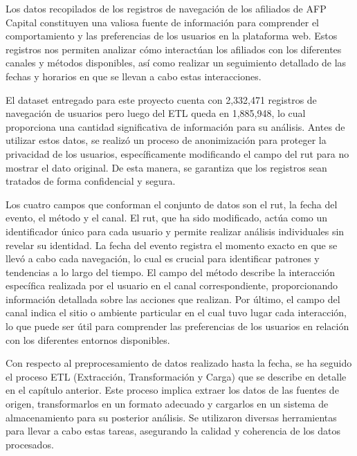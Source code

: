 Los datos recopilados de los registros de navegación de los afiliados de AFP Capital constituyen una valiosa fuente de información para comprender el comportamiento y las preferencias de los usuarios en la plataforma web. Estos registros nos permiten analizar cómo interactúan los afiliados con los diferentes canales y métodos disponibles, así como realizar un seguimiento detallado de las fechas y horarios en que se llevan a cabo estas interacciones.

El dataset entregado para este proyecto cuenta con 2,332,471 registros de navegación de usuarios pero luego del ETL queda en 1,885,948, lo cual proporciona una cantidad significativa de información para su análisis. Antes de utilizar estos datos, se realizó un proceso de anonimización para proteger la privacidad de los usuarios, específicamente modificando el campo del rut para no mostrar el dato original. De esta manera, se garantiza que los registros sean tratados de forma confidencial y segura.

Los cuatro campos que conforman el conjunto de datos son el rut, la fecha del evento, el método y el canal. El rut, que ha sido modificado, actúa como un identificador único para cada usuario y permite realizar análisis individuales sin revelar su identidad. La fecha del evento registra el momento exacto en que se llevó a cabo cada navegación, lo cual es crucial para identificar patrones y tendencias a lo largo del tiempo. El campo del método describe la interacción específica realizada por el usuario en el canal correspondiente, proporcionando información detallada sobre las acciones que realizan. Por último, el campo del canal indica el sitio o ambiente particular en el cual tuvo lugar cada interacción, lo que puede ser útil para comprender las preferencias de los usuarios en relación con los diferentes entornos disponibles.

Con respecto al preprocesamiento de datos realizado hasta la fecha, se ha seguido el proceso ETL (Extracción, Transformación y Carga) que se describe en detalle en el capítulo anterior. Este proceso implica extraer los datos de las fuentes de origen, transformarlos en un formato adecuado y cargarlos en un sistema de almacenamiento para su posterior análisis. Se utilizaron diversas herramientas para llevar a cabo estas tareas, asegurando la calidad y coherencia de los datos procesados.

